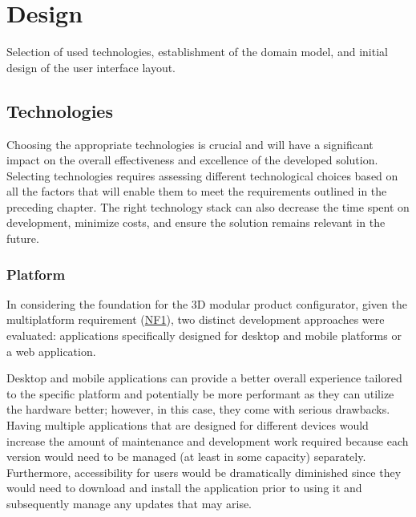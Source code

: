 \chapter{Design}

\begin{chapterabstract}
Selection of used technologies, establishment of the domain model, and initial design of the user interface layout.
\end{chapterabstract}


\section{Technologies}

Choosing the appropriate technologies is crucial and will have a significant impact on the overall effectiveness and excellence of the developed solution. Selecting technologies requires assessing different technological choices based on all the factors that will enable them to meet the requirements outlined in the preceding chapter. The right technology stack can also decrease the time spent on development, minimize costs, and ensure the solution remains relevant in the future.


\subsection{Platform}

In considering the foundation for the 3D modular product configurator, given the multiplatform requirement (\hyperref[itm:NF1]{NF1}), two distinct development approaches were evaluated: applications specifically designed for desktop and mobile platforms or a web application.

Desktop and mobile applications can provide a better overall experience tailored to the specific platform and potentially be more performant as they can utilize the hardware better; however, in this case, they come with serious drawbacks. Having multiple applications that are designed for different devices would increase the amount of maintenance and development work required because each version would need to be managed (at least in some capacity) separately. Furthermore, accessibility for users would be dramatically diminished since they would need to download and install the application prior to using it and subsequently manage any updates that may arise.

